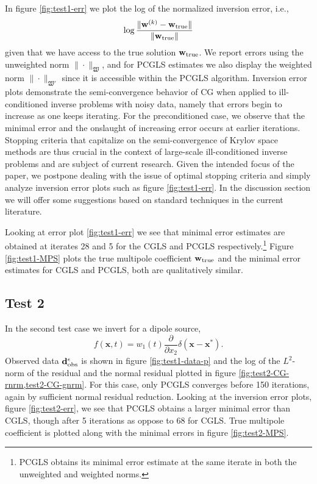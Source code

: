 In figure \ref{fig:test1-err} we plot the log of the normalized inversion error, i.e.,
\[
	\log \frac{\|\mathbf w^{(k)}-\mathbf w_{\rm true}\|}{\|\mathbf w_{\rm true}\|}
\]
given that we have access to the true solution $\mathbf w_{\rm true}$.
We report errors using the unweighted norm $\|\cdot\|_{\mathfrak W}$, and for PCGLS estimates we also display the weighted norm $\|\cdot\|_{\mathfrak W'}$ since it is accessible within the PCGLS algorithm.
Inversion error plots demonstrate the semi-convergence behavior of CG when applied to ill-conditioned inverse problems with noisy data, namely that errors begin to increase as one keeps iterating.
For the preconditioned case, we observe that the minimal error and the onslaught of increasing error occurs at earlier iterations.
Stopping criteria that capitalize on the semi-convergence of Krylov space methods are thus crucial in the context of large-scale ill-conditioned inverse problems and are subject of current research.
Given the intended focus of the paper, we postpone dealing with the issue of optimal stopping criteria and simply analyze inversion error plots such as figure \ref{fig:test1-err}.
In the discussion section we will offer some suggestions based on standard techniques in the current literature.

Looking at error plot \ref{fig:test1-err} we see that minimal error estimates are obtained at iterates 28 and 5 for the CGLS and PCGLS respectively.\footnote{PCGLS obtains its minimal error estimate at the same iterate in both the unweighted and weighted norms.}
Figure \ref{fig:test1-MPS} plots the true multipole coefficient $\mathbf w_{\rm true}$ and the minimal error estimates for CGLS and PCGLS, both are qualitatively similar.  

\subsection{Test 2}

In the second test case we invert for a dipole source,
\[
	f(\mathbf x,t) = w_1(t) \frac{\partial}{\partial x_2}\delta(\mathbf x-\mathbf x^*).
\]
Observed data $\mathbf d_{\rm obs}^{\epsilon}$ is shown in figure \ref{fig:test1-data-p} and the log of the $L^2$-norm of the residual and the normal residual plotted in figure \ref{fig:test2-CG-rnrm,test2-CG-gnrm}.
For this case, only PCGLS converges before 150 iterations, again by sufficient normal residual reduction.
Looking at the inversion error plots, figure \ref{fig:test2-err}, we see that PCGLS obtains a larger minimal error than CGLS, though after 5 iterations as oppose to 68 for CGLS.
True multipole coefficient is plotted along with the minimal errors in figure \ref{fig:test2-MPS}.

